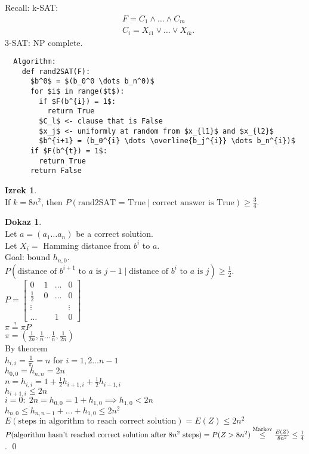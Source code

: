 \documentclass[a4paper, 12pt]{book}
\theoremstyle{definition}
\newtheorem{theorem}[counter]{Izrek}
\newtheorem{pro}[counter]{Dokaz}
\theoremstyle{remark}
\begin{document}
Recall: k-SAT:
\begin{align*}
  &F = C_1 \land \dots \land C_m \\
  &C_i = X_{i1} \lor \dots \lor X_{ik}.
\end{align*}
3-SAT: NP complete.
\begin{lstlisting}
  Algorithm:
    def rand2SAT(F):
      $b^0$ = $(b_0^0 \dots b_n^0)$
      for $i$ in range($t$):
        if $F(b^{i}) = 1$:
          return True
        $C_l$ <- clause that is False
        $x_j$ <- uniformly at random from $x_{l1}$ and $x_{l2}$
        $b^{i+1} = (b_0^{i} \dots \overline{b_j^{i}} \dots b_n^{i})$
      if $F(b^{t}) = 1$:
        return True
      return False
\end{lstlisting}
\begin{theorem} \text{} \\
  If $k = 8n^2$, then $P(\text{rand2SAT = True} \mid \text{correct answer is True}) \geq \frac{3}{4}$.
\end{theorem}
\begin{pro} \text{} \\
  Let $a = (a_1 \dots a_n)$ be a correct solution. \\
  Let $X_i =$ Hamming distance from $b^i$ to $a$. \\
  Goal: bound $h_{n,0}$. \\
  $P(\text{distance of } b^{i+1} \text{ to $a$ is } j-1 \mid \text{distance of $b^i$ to $a$ is } j) \geq \frac{1}{2}$. \\
  $P = \begin{bmatrix}
    0 & 1 & \dots & 0 \\
    \frac{1}{2} & 0 & \dots & 0 \\
    \vdots & & & \vdots \\
    \dots & & 1 & 0
  \end{bmatrix}$ \\
  $\pi \stackrel{?}{=} \pi P$ \\
  $\pi = (\frac{1}{2n}, \frac{1}{n} \dots \frac{1}{n}, \frac{1}{2n})$ \\
  By theorem \\
  $h_{i,i} = \frac{1}{\pi_i} = n$ for $i = 1, 2 \dots n-1$ \\
  $h_{0,0} = h_{n,n} = 2n$ \\
  $n = h_{i,i} = 1 + \frac{1}{2} h_{i+1,i} + \frac{1}{2} h_{i-1,i}$ \\
  $h_{i+1,i} \leq 2n$ \\
  $i = 0: \; 2n = h_{0,0} = 1 + h_{1,0} \implies h_{1,0} < 2n$ \\
  $h_{n,0} \leq h_{n,n-1} + \dots + h_{1,0} \leq 2n^2$ \\
  $E(\text{steps in algorithm to reach correct solution}) = E(Z) \leq 2n^2$ \\
  $P(\text{algorithm hasn't reached correct solution after $8n^2$ steps}) \\
  = P(Z > 8n^2) \stackrel{\text{Markov}}{\leq} \frac{E(Z)}{8n^2} \leq \frac{1}{4}$.
  \qed
\end{pro}
\end{document}
